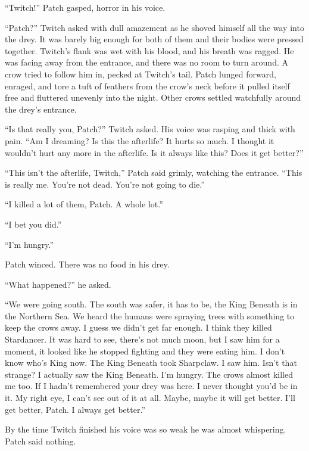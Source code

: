 \documentclass[ebook,oneside,openany,17pt]{memoir}
\newenvironment{tolerant}[1]{%
  \par\tolerance=#1\relax
}{%
  \par
}
\begin{document}
“Twitch!” Patch gasped, horror in his voice.

“Patch?” Twitch asked with dull amazement as he shoved himself all the
way into the drey. It was barely big enough for both of them and their
bodies were pressed together. Twitch’s flank was wet with his blood,
and his breath was ragged. He was facing away from the entrance, and
there was no room to turn around. A crow tried to follow him in,
pecked at Twitch’s tail. Patch lunged forward, enraged, and tore a
tuft of feathers from the crow’s neck before it pulled itself free and
fluttered unevenly into the night. Other crows settled watchfully
around the drey’s entrance.

\begin{tolerant}{500}
“Is that really you, Patch?” Twitch asked. His voice was rasping and
thick with pain. “Am I dreaming? Is this the afterlife? It hurts so
much. I thought it wouldn’t hurt any more in the afterlife. Is it
always like this? Does it get better?”
\end{tolerant}

\begin{tolerant}{500}
“This isn’t the afterlife, Twitch,” Patch said grimly, watching the
entrance. “This is really me. You’re not dead. You’re not going to
die.”
\end{tolerant}

“I killed a lot of them, Patch. A whole lot.”

“I bet you did.”

“I’m hungry.”

Patch winced. There was no food in his drey.

“What happened?” he asked.

“We were going south. The south was safer, it has to be, the King
Beneath is in the Northern Sea. We heard the humans were spraying
trees with something to keep the crows away. I guess we didn’t get far
enough. I think they killed Stardancer. It was hard to see, there’s
not much moon, but I saw him for a moment, it looked like he stopped
fighting and they were eating him. I don’t know who’s King now. The
King Beneath took Sharpclaw. I saw him. Isn’t that strange? I actually
saw the King Beneath. I’m hungry. The crows almost killed me too. If I
hadn’t remembered your drey was here. I never thought you’d be in
it. My right eye, I can’t see out of it at all. Maybe, maybe it will
get better. I’ll get better, Patch. I always get better.”

By the time Twitch finished his voice was so weak he was almost
whispering. Patch said nothing.
\end{document}
